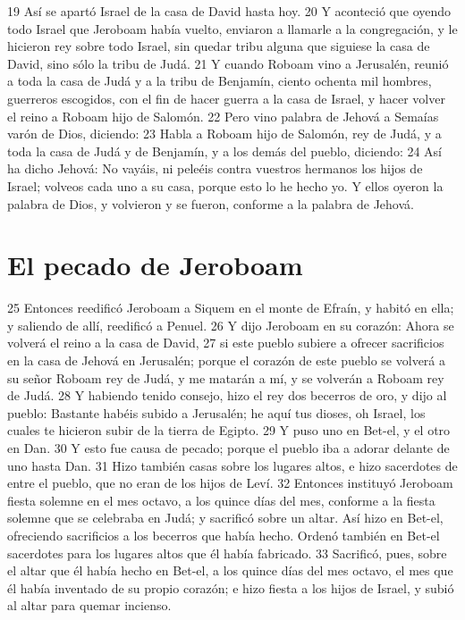 19 Así se apartó Israel de la casa de David hasta hoy.
20 Y aconteció que oyendo todo Israel que Jeroboam había vuelto, enviaron a llamarle a la congregación, y le hicieron rey sobre todo Israel, sin quedar tribu alguna que siguiese la casa de David, sino sólo la tribu de Judá.
21 Y cuando Roboam vino a Jerusalén, reunió a toda la casa de Judá y a la tribu de Benjamín, ciento ochenta mil hombres, guerreros escogidos, con el fin de hacer guerra a la casa de Israel, y hacer volver el reino a Roboam hijo de Salomón.
22 Pero vino palabra de Jehová a Semaías varón de Dios, diciendo:
23 Habla a Roboam hijo de Salomón, rey de Judá, y a toda la casa de Judá y de Benjamín, y a los demás del pueblo, diciendo:
24 Así ha dicho Jehová: No vayáis, ni peleéis contra vuestros hermanos los hijos de Israel; volveos cada uno a su casa, porque esto lo he hecho yo. Y ellos oyeron la palabra de Dios, y volvieron y se fueron, conforme a la palabra de Jehová.

\section*{El pecado de Jeroboam}

25 Entonces reedificó Jeroboam a Siquem en el monte de Efraín, y habitó en ella; y saliendo de allí, reedificó a Penuel.
26 Y dijo Jeroboam en su corazón: Ahora se volverá el reino a la casa de David,
27 si este pueblo subiere a ofrecer sacrificios en la casa de Jehová en Jerusalén; porque el corazón de este pueblo se volverá a su señor Roboam rey de Judá, y me matarán a mí, y se volverán a Roboam rey de Judá.
28 Y habiendo tenido consejo, hizo el rey dos becerros de oro, y dijo al pueblo: Bastante habéis subido a Jerusalén; he aquí tus dioses, oh Israel, los cuales te hicieron subir de la tierra de Egipto. 
29 Y puso uno en Bet-el, y el otro en Dan.
30 Y esto fue causa de pecado; porque el pueblo iba a adorar delante de uno hasta Dan.
31 Hizo también casas sobre los lugares altos, e hizo sacerdotes de entre el pueblo, que no eran de los hijos de Leví.
32 Entonces instituyó Jeroboam fiesta solemne en el mes octavo, a los quince días del mes, conforme a la fiesta solemne que se celebraba en Judá; y sacrificó sobre un altar. Así hizo en Bet-el, ofreciendo sacrificios a los becerros que había hecho. Ordenó también en Bet-el sacerdotes para los lugares altos que él había fabricado.
33 Sacrificó, pues, sobre el altar que él había hecho en Bet-el, a los quince días del mes octavo, el mes que él había inventado de su propio corazón; e hizo fiesta a los hijos de Israel, y subió al altar para quemar incienso.

